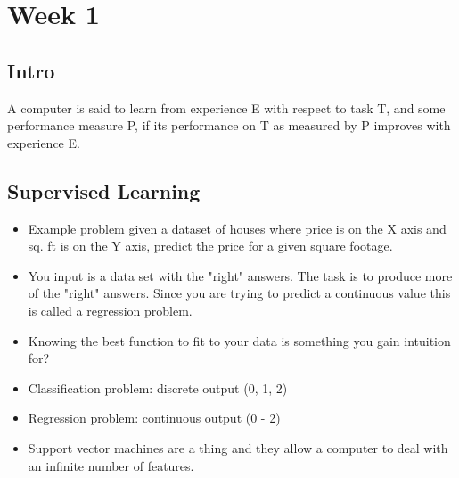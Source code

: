 \documentclass[11pt]{article}
\author{Mackenzie Starr}
\date{\today}
\title{}
\begin{document}
\tableofcontents

\section{Week 1}
\label{sec:org6848b85}
\subsection{Intro}
\label{sec:org70aeddf}
A computer is said to learn from experience E with respect to task T,
and some performance measure P, if its performance on T as measured by
P improves with experience E.

\subsection{Supervised Learning}
\label{sec:org836dc09}
\begin{itemize}
\item Example problem given a dataset of houses where price is on the X
axis and sq. ft is on the Y axis, predict the price for a given
square footage.

\item You input is a data set with the "right" answers. The task is to
produce more of the "right" answers. Since you are trying to predict
a continuous value this is called a regression problem.

\item Knowing the best function to fit to your data is something you gain intuition for?

\item Classification problem: discrete output (0, 1, 2)
\item Regression problem: continuous output (0 - 2)

\item Support vector machines are a thing and they allow a computer to
deal with an infinite number of features.
\end{itemize}
\end{document}
